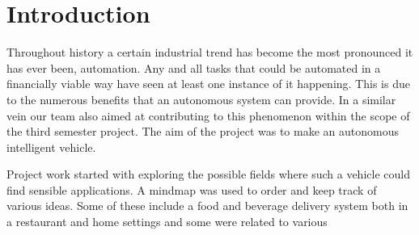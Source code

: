 \documentclass[11pt]{article}
\begin{document}
    \section{Introduction}
    Throughout history a certain industrial trend has become the most pronounced 
    it has ever been, automation. Any and all tasks that could be automated in a
    financially viable way have seen at least one instance of it happening. This
    is due to the numerous benefits that an autonomous system can provide. In a
    similar vein our team also aimed at contributing to this phenomenon within 
    the scope of the third semester project. The aim of the project was to make
    an autonomous intelligent vehicle.

    Project work started with exploring the possible fields where such a vehicle
    could find sensible applications. A mindmap was used to order and keep track
    of various ideas. Some of these include a food and beverage delivery system
    both in a restaurant and home settings and some were related to various 
\end{document}
